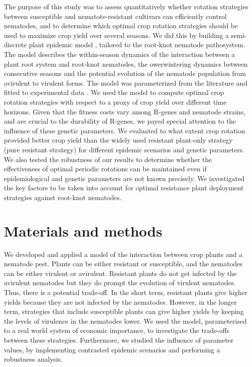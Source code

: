 {{{{The purpose of this study was to assess quantitatively whether
rotation strategies between susceptible and nematote-resistant
cultivars can efficiently control nematodes, and to
determine which optimal crop rotation strategies should be used to
maximize crop yield over several seasons. We did this by building a
semi-discrete plant epidemic model \citep{Fabre2012, Mailleret2009,
  Mailleret2012}, tailored to the {root-knot nematode}
pathosystem. The model describes the within-season dynamics of the
interaction between a plant root system and {root-knot nematodes}, the
owerwintering dynamics between consecutive seasons and the potential
evolution of the nematode population from avirulent to virulent
forms. The model was parameterized from the literature and fitted to
experimental data \citep{Ehwaeti1998}.  We used the model to compute
optimal crop rotation strategies with respect to a proxy of crop yield
over different time horizons. Given that the fitness costs vary among
R-genes and nematode strains, and are crucial to the durability of
R-genes, we payed special attention to the influence of these genetic
parameters. We evaluated to what extent crop rotation provided better
crop yield than the widely used resistant plant-only strategy (pure
resistant strategy) for different epidemic scenarios and genetic
parameters. We also tested the robustness of our results to determine
whether the effectiveness of optimal periodic rotations can be
maintained even if epidemiological and genetic parameters are not
known precisely. We investigated the key factors to be taken into
account for optimal resistance plant deployment strategies against
{root-knot nematodes}.



\section{Materials and methods}

We developed and applied a model of the interaction between crop
plants and a nematode pest. Plants can be either resistant or
susceptible, and the nematodes can be either virulent or
avirulent. Resistant plants do not get infected by the avirulent
nematodes but they do prompt the evolution of virulent
nematodes. Thus, there is a potential trade-off. In the short term,
resistant plants give higher yields because they are not infected by
the nematodes. However, in the longer term, strategies that include
susceptible plants can give higher yields by keeping the levels of
virulence in the nematodes lower. We used the model, parameterised to
a real world system of economic importance, to investigate the
trade-offs between these strategies. Furthermore, we studied the
influence of parameter values, by implementing contrasted epidemic
scenarios and performing a robustness analysis.

}}}}
